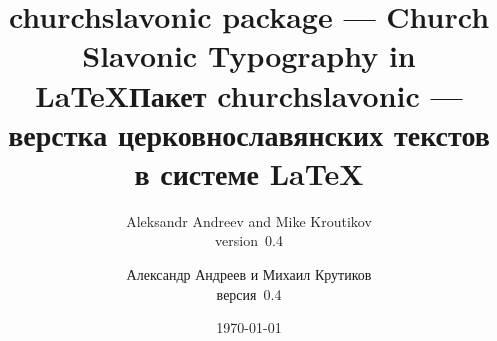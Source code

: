 \usepackage{fontspec,metalogo}

\newfontfamily{}
\newfontfamily{}
\setmonofont[Scale=MatchLowercase]{Fira Slav}
\newfontfamily{}
\newfontfamily{}
\newfontfamily{}
\newfontfamily{}
\newfontfamily{}

\usepackage{churchslavonic}
\usepackage{doc}
\usepackage{lettrine}
\usepackage[unicode,
  pdftitle={churchslavonic: a package for typesetting Church Slavonic documents in TeX},
  pdfauthor={Aleksandr Andreev and Mike Kroutikov},
  pdfkeywords={Church Slavonic, Old Church Slavonic, Church Slavic, Znamenny Notation, LaTeX, TeX, XeTeX, LuaTeX, OpenType, Unicode, церковнославянский, старославянский, знаменная нотация, крюки, столповая нотация}
]{hyperref}

\def\fileversion{0.4}
\let\cuKrukFont=\musicFont
\def\pkg#1{\textsf{#1}}
\def\cs#1{\texttt{\textbackslash #1}}
%
%
\makeatletter
\def\cu@lettrine{\lettrine[lines=3,findent=0pt,nindent=0pt]}
\def\cuLettrine{\cu@tokenizeletter\cu@lettrine}
\renewcommand{\LettrineFontHook}{\cuKinovarColor}
\makeatother



\begin{EN}
\title{\pkg{churchslavonic} package --- Church Slavonic Typography in \LaTeX}
\author{Aleksandr Andreev and Mike Kroutikov\\version~\fileversion}
\end{EN}

\begin{RU}
\title{Пакет \pkg{churchslavonic} --- верстка церковнославянских текстов в системе \LaTeX}
\author{Александр Андреев и Михаил Крутиков\\версия~\fileversion}
\end{RU}

\date{\today}
\maketitle


